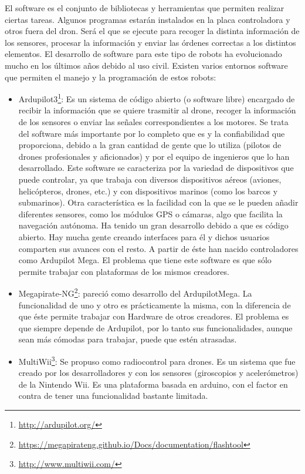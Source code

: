 El software es el conjunto de bibliotecas y herramientas que permiten realizar ciertas tareas. Algunos programas estarán instalados en la placa controladora y otros fuera del dron. Será el que se ejecute para recoger la distinta información de los sensores, procesar la información y enviar las órdenes correctas a los distintos elementos. El desarrollo de software para este tipo de robots ha evolucionado mucho en los últimos años debido al uso civil. Existen varios entornos software que permiten el manejo y la programación de estos robots:
\begin{itemize}
\item Ardupilot3\footnote{\url{http://ardupilot.org/}}: Es un sistema de código abierto (o software libre) encargado de recibir la información que se quiere trasmitir al drone, recoger la información de los sensores o enviar las señales correspondientes a los motores. Se trata del software más importante por lo completo que es y la confiabilidad que proporciona, debido a la gran cantidad de gente que lo utiliza (pilotos de drones profesionales y aficionados) y por el equipo de ingenieros que lo han desarrollado. Este software se caracteriza por la variedad de dispositivos que puede controlar, ya que trabaja con diversos dispositivos aéreos (aviones, helicópteros, drones, etc.) y con dispositivos marinos (como los barcos y submarinos). Otra característica es la facilidad con la que se le pueden añadir diferentes sensores, como los módulos GPS o cámaras, algo que facilita la navegación autónoma. Ha tenido un gran desarrollo debido a que es código abierto. Hay mucha gente creando interfaces para él y dichos usuarios comparten sus avances con el resto. A partir de éste han nacido controladores como Ardupilot Mega. El problema que tiene este software es que sólo permite trabajar con plataformas de los mismos creadores. 
\item Megapirate-NG\footnote{\url{https://megapirateng.github.io/Docs/documentation/flashtool}}:  pareció como desarrollo del ArdupilotMega. La funcionalidad de uno y otro es prácticamente la misma, con la diferencia de que éste permite trabajar con Hardware de otros creadores. El problema es que siempre depende de Ardupilot, por lo tanto sus funcionalidades, aunque sean más cómodas para trabajar, puede que estén atrasadas.
\item MultiWii\footnote{\url{http://www.multiwii.com/}}: Se propuso como radiocontrol para drones. Es un sistema que fue creado por los desarrolladores y con los sensores (giroscopios y acelerómetros) de la Nintendo Wii. Es una plataforma basada en arduino, con el factor en contra de tener una funcionalidad bastante limitada.

\end{itemize}

